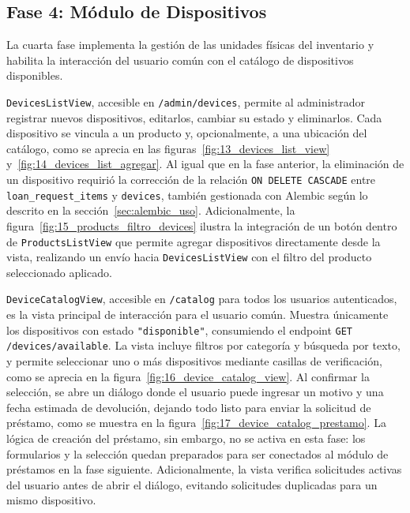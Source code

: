\subsection{Fase 4: Módulo de Dispositivos}

La cuarta fase implementa la gestión de las unidades físicas del inventario y 
habilita la interacción del usuario común con el catálogo de dispositivos 
disponibles.

\texttt{DevicesListView}, accesible en \texttt{/admin/devices}, permite al 
administrador registrar nuevos dispositivos, editarlos, cambiar su estado y 
eliminarlos. Cada dispositivo se vincula a un producto y, opcionalmente, a una 
ubicación del catálogo, como se aprecia en las 
figuras~\ref{fig:13_devices_list_view} y~\ref{fig:14_devices_list_agregar}.
Al igual que en la fase anterior, la eliminación de un 
dispositivo requirió la corrección de la relación \texttt{ON DELETE CASCADE} entre 
\texttt{loan\_request\_items} y \texttt{devices}, también gestionada con Alembic 
según lo descrito en la sección~\ref{sec:alembic_uso}.
Adicionalmente, la figura~\ref{fig:15_products_filtro_devices} ilustra la integración 
de un botón dentro de \texttt{ProductsListView} que permite agregar dispositivos 
directamente desde la vista, realizando un envío hacia \texttt{DevicesListView} con 
el filtro del producto seleccionado aplicado.

\texttt{DeviceCatalogView}, accesible en \texttt{/catalog} para todos los usuarios 
autenticados, es la vista principal de interacción para el usuario común. Muestra 
únicamente los dispositivos con estado \texttt{"disponible"}, consumiendo el endpoint 
\texttt{GET /devices/available}. La vista incluye filtros por categoría y búsqueda 
por texto, y permite seleccionar uno o más dispositivos mediante casillas de 
verificación, como se aprecia en la figura~\ref{fig:16_device_catalog_view}.
Al confirmar la selección, se abre un diálogo donde el usuario puede 
ingresar un motivo y una fecha estimada de devolución, dejando todo listo para enviar 
la solicitud de préstamo, como se muestra en la figura~\ref{fig:17_device_catalog_prestamo}.
La lógica de creación del préstamo, sin embargo, no se 
activa en esta fase: los formularios y la selección quedan preparados para ser 
conectados al módulo de préstamos en la fase siguiente. Adicionalmente, la vista 
verifica solicitudes activas del usuario antes de abrir el diálogo, evitando 
solicitudes duplicadas para un mismo dispositivo.

